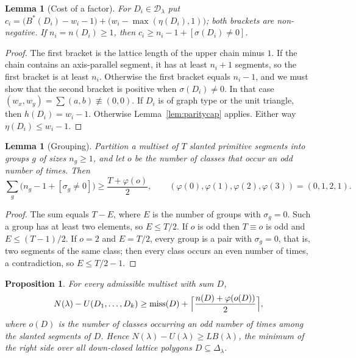 \documentclass[11pt]{amsart}
\newtheorem{lemma}[theorem]{Lemma}
\newtheorem{proposition}[theorem]{Proposition}
\theoremstyle{definition}
\theoremstyle{remark}
\newcommand{\miss}{\operatorname{miss}}
\numberwithin{equation}{section}
\begin{document}
\begin{lemma}[Cost of a factor]\label{lem:factorcost}
For $D_i\in\mathcal D_\lambda$ put
$c_i=\bigl(B^*(D_i)-w_i-1\bigr)+\bigl(w_i-\max(\eta(D_i),1)\bigr)$; both brackets are
non-negative. If $n_i=n(D_i)\ge1$, then $c_i\ge n_i-1+[\sigma(D_i)\ne0]$.
\end{lemma}

\begin{proof}
The first bracket is the lattice length of the upper chain minus $1$. If the chain contains
an axis-parallel segment, it has at least $n_i+1$ segments, so the first bracket is at least
$n_i$. Otherwise the first bracket equals $n_i-1$, and we must show that the second bracket is
positive when $\sigma(D_i)\ne0$. In that case $(w_x,w_y)=\sum(a,b)\not\equiv(0,0)$. If $D_i$ is
of graph type or the unit triangle, then $h(D_i)=w_i-1$. Otherwise
Lemma~\ref{lem:paritycap} applies. Either way $\eta(D_i)\le w_i-1$.
\end{proof}

\begin{lemma}[Grouping]\label{lem:grouping}
Partition a multiset of $T$ slanted primitive segments into groups $g$ of sizes $n_g\ge1$, and
let $o$ be the number of classes that occur an odd number of times. Then
\[
\sum_g\bigl(n_g-1+[\sigma_g\ne0]\bigr)\ge\frac{T+\varphi(o)}{2},\qquad
(\varphi(0),\varphi(1),\varphi(2),\varphi(3))=(0,1,2,1).
\]
\end{lemma}

\begin{proof}
The sum equals $T-E$, where $E$ is the number of groups with $\sigma_g=0$. Such a group has
at least two elements, so $E\le T/2$. If $o$ is odd then $T\equiv o$ is odd and
$E\le(T-1)/2$. If $o=2$ and $E=T/2$, every group is a pair with $\sigma_g=0$, that is, two
segments of the same class; then every class occurs an even number of times, a
contradiction, so $E\le T/2-1$.
\end{proof}

\begin{proposition}\label{prop:LB}
For every admissible multiset with sum $D$,
\[
N(\lambda)-U(D_1,\dots,D_k)\ge\miss(D)+\Bigl\lceil\frac{n(D)+\varphi(o(D))}{2}\Bigr\rceil,
\]
where $o(D)$ is the number of classes occurring an odd number of times among the slanted
segments of $D$. Hence $N(\lambda)-U(\lambda)\ge LB(\lambda)$, the minimum of the right side
over all down-closed lattice polygons $D\subseteq\Delta_\lambda$.
\end{proposition}
\end{document}
